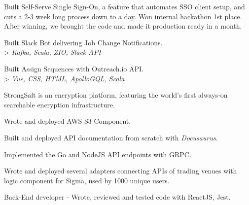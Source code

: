 \documentclass[]{deedy-resume-openfont}
\begin{document}
\begin{minipage}[t]{0.66\textwidth}
\begin{tightemize}
\end{tightemize}
\sectionsep
{}
\vspace{\topsep} %
\begin{tightemize}
\item Built Self-Serve Single Sign-On, a feature that automates SSO client setup, and cuts a 2-3 week long process down to a day. 
Won internal hackathon 1st place. After winning, we brought the code and made it production ready in a month.
\item Built Slack Bot delivering Job Change Notifications. \\ > \emph{Kafka, Scala, ZIO, Slack API}
\item Built Assign Sequences with Outreach.io API.\\ > \emph{Vue, CSS, HTML, ApolloGQL, Scala}
\end{tightemize}
\sectionsep
{}
\vspace{\topsep} %
\begin{tightemize}
\item StrongSalt is an encryption platform, featuring the world’s first always-on searchable encryption infrastructure.
\item Wrote and deployed AWS S3 Component.
\item Built and deployed API documentation from scratch with \textit{Docusaurus}.
\item Implemented the Go and NodeJS API endpoints with GRPC.
\end{tightemize}
\sectionsep
{}
\vspace{\topsep} %
\begin{tightemize}
\item Wrote and deployed several adapters connecting APIs of trading venues with logic component for Sigma, used by 1000 unique users.
\item Back-End developer - Wrote, reviewed and tested code with ReactJS, Jest.
\end{tightemize}
\sectionsep



\end{minipage}
\end{document}
